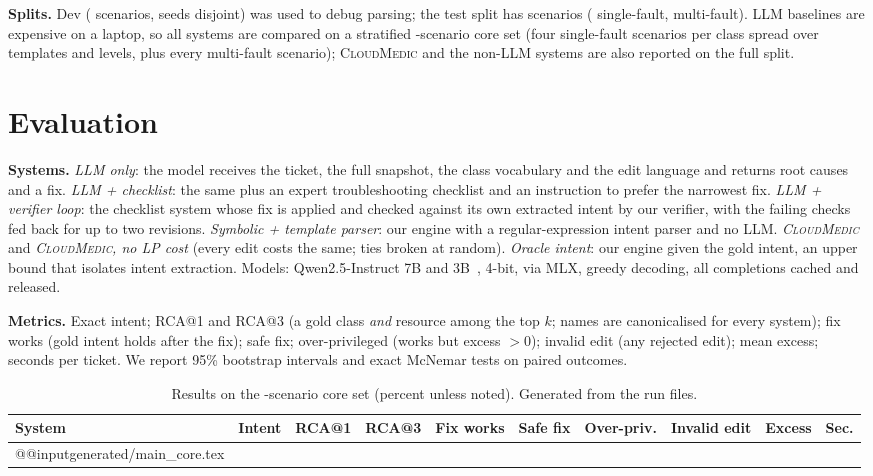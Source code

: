 \documentclass[conference]{IEEEtran}
\newcommand{\sys}{\textsc{CloudMedic}}
\begin{document}
\textbf{Splits.} Dev (\NDev{} scenarios, seeds disjoint) was used to debug parsing; the test split has \NTest{} scenarios
(\NSingle{} single-fault, \NMulti{} multi-fault). LLM baselines are expensive on a laptop, so all systems are compared on a
stratified \NCore{}-scenario core set (four single-fault scenarios per class spread over templates and levels, plus every
multi-fault scenario); \sys{} and the non-LLM systems are also reported on the full split.

\section{Evaluation}\label{sec:eval}
\textbf{Systems.} \emph{LLM only}: the model receives the ticket, the full snapshot, the class vocabulary and the edit language
and returns root causes and a fix. \emph{LLM + checklist}: the same plus an expert troubleshooting checklist and an
instruction to prefer the narrowest fix. \emph{LLM + verifier loop}: the checklist system whose fix is applied and checked
against its own extracted intent by our verifier, with the failing checks fed back for up to two revisions. \emph{Symbolic +
template parser}: our engine with a regular-expression intent parser and no LLM. \emph{\sys{}} and \emph{\sys{}, no LP cost}
(every edit costs the same; ties broken at random). \emph{Oracle intent}: our engine given the gold intent, an upper bound
that isolates intent extraction. Models: Qwen2.5-Instruct 7B and 3B~\cite{qwen2024qwen25}, 4-bit, via MLX, greedy decoding,
all completions cached and released.

\textbf{Metrics.} Exact intent; RCA@1 and RCA@3 (a gold class \emph{and} resource among the top $k$; names are canonicalised
for every system); fix works (gold intent holds after the fix); safe fix; over-privileged (works but excess $> 0$); invalid
edit (any rejected edit); mean excess; seconds per ticket. We report 95\% bootstrap intervals and exact McNemar tests on paired
outcomes.

\begin{table}[t]\centering\scriptsize
\caption{Results on the \NCore{}-scenario core set (percent unless noted). Generated from the run files.}\label{tab:main}
\begin{tabular}{lrrrrrrrrr}\toprule
System & Intent & RCA@1 & RCA@3 & Fix works & Safe fix & Over-priv. & Invalid edit & Excess & Sec. \\\midrule
\csname @@input\endcsname generated/main_core.tex 
\bottomrule\end{tabular}
\end{table}
\end{document}
